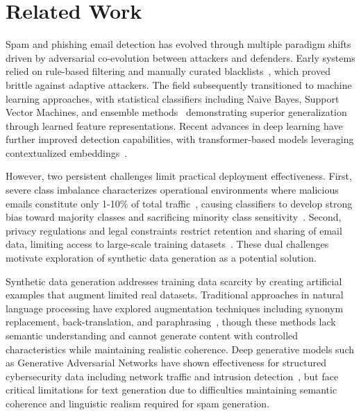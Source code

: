 \section{Related Work}
\label{sec:related}




Spam and phishing email detection has evolved through multiple paradigm shifts driven by adversarial co-evolution between attackers and defenders. Early systems relied on rule-based filtering and manually curated blacklists~\cite{al2023multi,magdy2022efficient}, which proved brittle against adaptive attackers. The field subsequently transitioned to machine learning approaches, with statistical classifiers including Naive Bayes, Support Vector Machines, and ensemble methods~\cite{kontsewaya2021evaluating,wijaya2023spam,budiman2024email,bazzaz2021hybrid,wang2025hybrid} demonstrating superior generalization through learned feature representations. Recent advances in deep learning have further improved detection capabilities, with transformer-based models leveraging contextualized embeddings~\cite{altwaijry2024advancing,thakur2023systematic}.

However, two persistent challenges limit practical deployment effectiveness. First, severe class imbalance characterizes operational environments where malicious emails constitute only 1-10\% of total traffic~\cite{bazzaz2021hybrid,johari2025key}, causing classifiers to develop strong bias toward majority classes and sacrificing minority class sensitivity~\cite{wang2025hybrid}. Second, privacy regulations and legal constraints restrict retention and sharing of email data, limiting access to large-scale training datasets~\cite{kim2023pcsf}. These dual challenges motivate exploration of synthetic data generation as a potential solution.


Synthetic data generation addresses training data scarcity by creating artificial examples that augment limited real datasets. Traditional approaches in natural language processing have explored augmentation techniques including synonym replacement, back-translation, and paraphrasing~\cite{shorten2021text}, though these methods lack semantic understanding and cannot generate content with controlled characteristics while maintaining realistic coherence. Deep generative models such as Generative Adversarial Networks have shown effectiveness for structured cybersecurity data including network traffic and intrusion detection~\cite{bourou2021review,ammara2025syntheticnetworktrafficdata,10765501,agrawal2024review}, but face critical limitations for text generation due to difficulties maintaining semantic coherence and linguistic realism required for spam generation.

